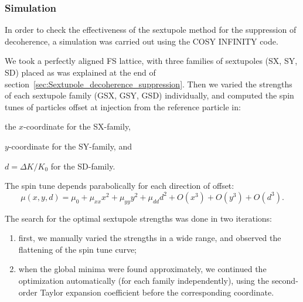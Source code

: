 \documentclass{article}
\begin{document}
\subsubsection{Simulation}
In order to check the effectiveness of the sextupole method for the suppression of decoherence, a simulation was carried out using the COSY INFINITY code.

We took a perfectly aligned FS lattice, with three families of sextupoles (SX, SY, SD) placed as was explained at the end of section~\ref{sec:Sextupole_decoherence_suppression}. Then we varied the strengths of each sextupole family (GSX, GSY, GSD) individually, and computed the spin tunes of particles offset at injection from the reference particle in:
\begin{inparaenum}
\item the $x$-coordinate for the SX-family,
\item $y$-coordinate for the SY-family, and
\item $d=\Delta K/K_0$ for the SD-family.
\end{inparaenum}

The spin tune depends parabolically for each direction of offset:
\[
\mu(x,y,d) = \mu_0 + \mu_{xx}x^2 + \mu_{yy}y^2 + \mu_{dd}d^2 + O(x^3) + O(y^3) + O(d^3).
\]

The search for the optimal sextupole strengths was done in two iterations:
\begin{enumerate}
\item first, we manually varied the strengths in a wide range, and observed the flattening of the spin tune curve;
\item when the global minima were found approximately, we continued the optimization automatically (for each family independently), using the second-order Taylor expansion coefficient before the corresponding coordinate.
\end{enumerate}
\end{document}
